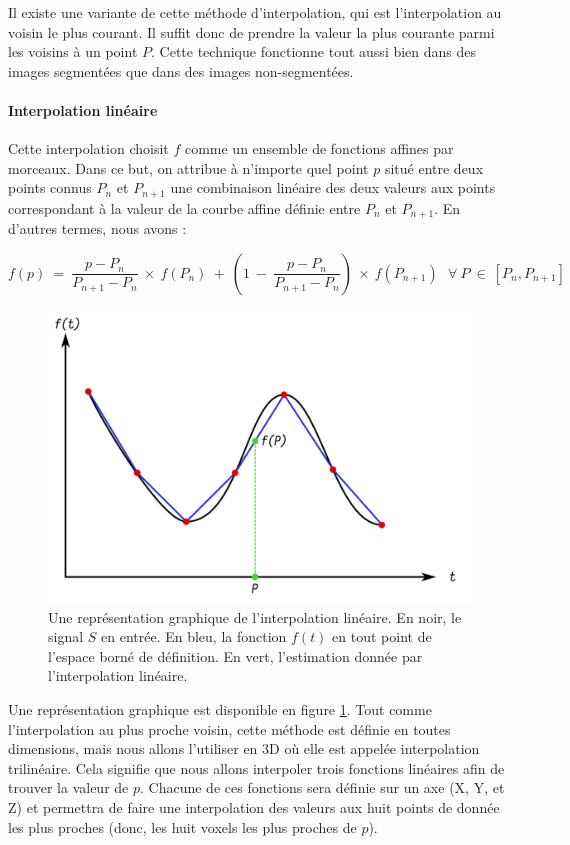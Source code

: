{{{{				Il existe une variante de cette méthode d'interpolation, qui est l'interpolation au voisin le plus courant. Il suffit donc de prendre la valeur la plus courante parmi les voisins à un point $P$. Cette technique fonctionne tout aussi bien dans des images segmentées que dans des images non-segmentées.
			}

			\paragraph{Interpolation linéaire}
			{
				Cette interpolation choisit $f$ comme un ensemble de fonctions affines par morceaux. Dans ce but, on attribue à n'importe quel point $p$ situé entre deux points connus $P_n$ et $P_{n+1}$ une combinaison linéaire des deux valeurs aux points correspondant à la valeur de la courbe affine définie entre $P_n$ et $P_{n+1}$. En d'autres termes, nous avons :

				$$f(p)~=~\frac{p-P_n}{P_{n+1}-P_n}~\times~f(P_n)~+~(1~-~\frac{p-P_n}{P_{n+1}-P_n})~\times~f(P_{n+1})~~~\forall~P~\in~[P_n, P_{n+1}]$$

				\begin{figure}[!h]
				    \centering
				    \includegraphics[width=.67\linewidth]{img/interpolation_linear_with_point.png}
				    \captionsetup{width=.8\linewidth}
				    \caption{Une représentation graphique de l'interpolation linéaire. En noir, le signal $S$ en entrée. En bleu, la fonction $f(t)$ en tout point de l'espace borné de définition. En vert, l'estimation donnée par l'interpolation linéaire.}
				    \label{img:interpolation_linear_with_point}
				\end{figure}

				Une représentation graphique est disponible en figure \ref{img:interpolation_linear_with_point}. Tout comme l'interpolation au plus proche voisin, cette méthode est définie en toutes dimensions, mais nous allons l'utiliser en 3D où elle est appelée interpolation trilinéaire. Cela signifie que nous allons interpoler trois fonctions linéaires afin de trouver la valeur de $p$. Chacune de ces fonctions sera définie sur un axe (X, Y, et Z) et permettra de faire une interpolation des valeurs aux huit points de donnée les plus proches (donc, les huit voxels les plus proches de $p$).
			}
		}
		
}}
